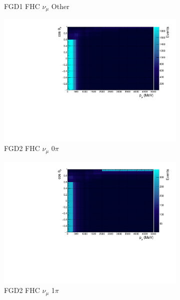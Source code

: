 \begin{figure}
\begin{subfigure}{.32\textwidth}
  \caption{FGD1 FHC $\nu_{\mu}$ Other}
  \label{fig:th2dFGD1_numuCC_other}
\end{subfigure}
\centering
\begin{subfigure}{.32\textwidth}
  \centering
  \includegraphics[width=0.95\linewidth]{figs/TH2D_MC_FGD2_numuCC_0pi}
  \caption{FGD2 FHC $\nu_{\mu}$ 0$\pi$}
  \label{fig:th2dFGD2_numuCC_0pi}
\end{subfigure}
\begin{subfigure}{.32\textwidth}
  \centering
  \includegraphics[width=0.95\linewidth]{figs/TH2D_MC_FGD2_numuCC_1pi}
  \caption{FGD2 FHC $\nu_{\mu}$ 1$\pi$}
  \label{fig:th2dFGD2_numuCC_1pi}
\end{subfigure}
\begin{subfigure}{.32\textwidth}
  \centering

\end{subfigure}
\end{figure}
